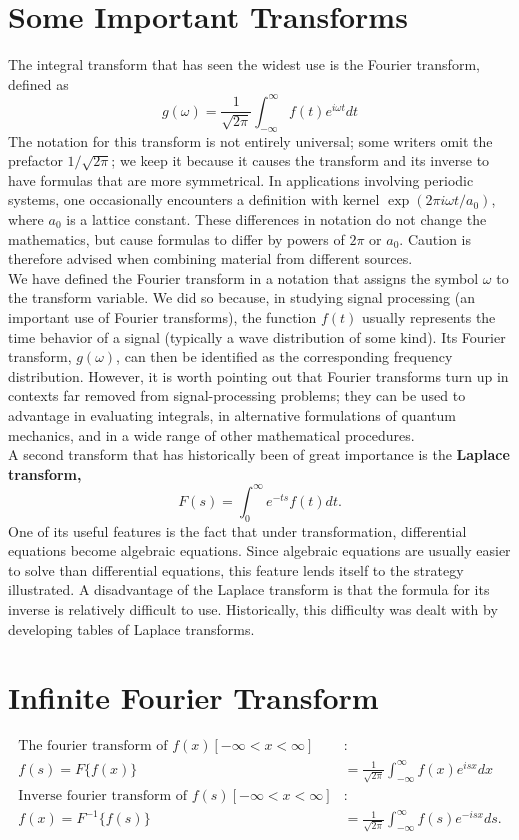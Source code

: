 \section{Some Important Transforms}
The integral transform that has seen the widest use is the Fourier transform, defined as
\begin{equation}
g(\omega)=\frac{1}{\sqrt{2 \pi}} \int_{-\infty}^{\infty} f(t) e^{i \omega t} d t
\end{equation}
The notation for this transform is not entirely universal; some writers omit the prefactor $1 / \sqrt{2 \pi}$; we keep it because it causes the transform and its inverse to have formulas that are more symmetrical. In applications involving periodic systems, one occasionally encounters a definition with kernel $\exp \left(2 \pi i \omega t / a_{0}\right)$, where $a_{0}$ is a lattice constant. These differences in notation do not change the mathematics, but cause formulas to differ by powers of $2 \pi$ or $a_{0}$. Caution is therefore advised when combining material from different sources.\\
We have defined the Fourier transform in a notation that assigns the symbol $\omega$ to the transform variable. We did so because, in studying signal processing (an important use of Fourier transforms), the function $f(t)$ usually represents the time behavior of a signal (typically a wave distribution of some kind). Its Fourier transform, $g(\omega)$, can then be identified as the corresponding frequency distribution. However, it is worth pointing out that Fourier transforms turn up in contexts far removed from signal-processing problems; they can be used to advantage in evaluating integrals, in alternative formulations of quantum mechanics, and in a wide range of other mathematical procedures.\\
A second transform that has historically been of great importance is the \textbf{Laplace transform,}
\begin{equation}
F(s)=\int_{0}^{\infty} e^{-t s} f(t) d t .
\end{equation}
One of its useful features is the fact that under transformation, differential equations become algebraic equations. Since algebraic equations are usually easier to solve than differential equations, this feature lends itself to the strategy illustrated. A disadvantage of the Laplace transform is that the formula for its inverse is relatively difficult to use. Historically, this difficulty was dealt with by developing tables of Laplace transforms.
\section{Infinite Fourier Transform}
\begin{align*}
\text{The fourier transform of }f(x)[-\infty<x<\infty] &:\\
f(s)=F\{f(x)\}&=\frac{1}{\sqrt{2 \pi}} \int_{-\infty}^{\infty} f(x) e^{i s x} d x\\
\text{Inverse fourier transform of }f(s)[-\infty<x<\infty] &:\\
f(x)=F^{-1}\{f(s)\}&=\frac{1}{\sqrt{2 \pi}} \int_{-\infty}^{\infty} f(s) e^{-i s x} d s .
\end{align*}

